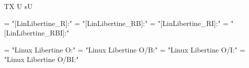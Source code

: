 


\ifx\ffdecl\undefined  \fi

 {\mono \sans \caps} {} {TX} {U sU}

\ismacro{}\iftrue %

   \font\tenrm = "[LinLibertine_R]:\fontfeatures"   \sizespec
   \font\tenbf = "[LinLibertine_RB]:\fontfeatures"  \sizespec
   \font\tenit = "[LinLibertine_RI]:\fontfeatures"  \sizespec
   \font\tenbi = "[LinLibertine_RBI]:\fontfeatures" \sizespec

   \def\singlefonts{%
      \font\initialfont  = "[LinLibertine_I]:\fontfeatures" \sizespec 
      \font\displayfont  = "[LinLibertine_DR]:\fontfeatures" \sizespec 
      \font\keyboardfont = "[LinBiolinum_K]:\fontfeatures" \sizespec 
   }  %

   \def\ffnamegen{"[Lin\mainfamV_\ffvarV]:\capsV\fontfeatures"} 

   \def\roman  {\ffvars{R}{RB}{RI}{RBI}\ffsetX}  \def\mainfamV{Libertine}
   \def\sans   {\ffvars{R}{RB}{RI}{RBO}\ffsetV{mainfam}{Biolinum}\ffsetX}
   \def\mono   {\ffvars{M}{MB}{MO}{MBO}\ffsetX} 
   \def\caps   {\ffsetV{caps}{+smcp}\ffsetX} 
   \def\nocaps {\ffsetX}
   \roman\nocaps\relax %

\fi

\ismacro{}\iftrue %

   \font\tenrm = "Linux Libertine O:\fontfeatures"    \sizespec
   \font\tenbf = "Linux Libertine O/B:\fontfeatures"  \sizespec
   \font\tenit = "Linux Libertine O/I:\fontfeatures"  \sizespec
   \font\tenbi = "Linux Libertine O/BI:\fontfeatures" \sizespec

   \def\singlefonts{%
      \font\initialfont  = "Linux Libertine Initials O:\fontfeatures" \sizespec 
      \font\displayfont  = "Linux Libertine Display O:\fontfeatures" \sizespec 
      \font\keyboardfont = "Linux Biolinum Keyboard O:\fontfeatures" \sizespec 
   }  %


